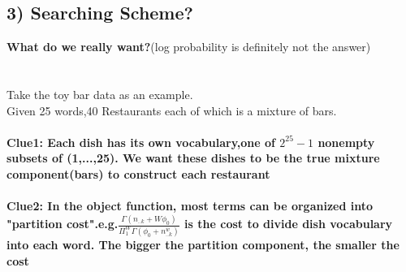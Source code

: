 \documentclass{article}
\begin{document}
\begin{spacing}{1.1}
\section{3) Searching Scheme?}
{\bf What do we really want?}(log probability is definitely not the answer)\\ \\ \\
Take the toy bar data as an example.\\
Given 25 words,40 Restaurants each of which is a mixture of bars.\\ \\
{\bf Clue1:   Each dish has its own vocabulary,one of $2^{25}-1$ nonempty subsets of (1,...,25). 
We want these dishes to be the true mixture component(bars) to construct each restaurant}\\ \\
{\bf Clue2:   In the object function, most terms can be organized into "partition cost".e.g.$\frac{\Gamma(n_{..k}+W\phi_{0})}{\Pi_{1}^{W}\Gamma(\phi_{0}+n_{..k}^{w})}$
 is the cost to divide dish vocabulary into each word. The bigger the partition component, the smaller the cost}\\ \\




\end{spacing}
\end{document}
